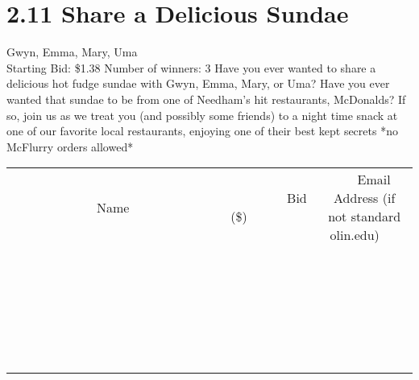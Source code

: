 \documentclass[11pt]{article}
\begin{document}
\section*{2.11 Share a Delicious Sundae}
Gwyn, Emma, Mary, Uma
\\
Starting Bid: \$1.38
\newline
Number of winners: 3
\newline
Have you ever wanted to share a delicious hot fudge sundae with Gwyn, Emma, Mary, or Uma? Have you ever wanted that sundae to be from one of Needham's hit restaurants, McDonalds? If so, join us as we treat you (and possibly some friends) to a night time snack at one of our favorite local restaurants, enjoying one of their best kept secrets *no McFlurry orders allowed*
\\[6ex]
\begin{tabular}{c c c}
~~~~~~~~~~~~~Name~~~~~~~~~~~~~ & ~~~~~~~~~Bid (\$)~~~~~~~~~  & ~~~Email Address (if not standard olin.edu)~~~\\
 & & \\
\hline
 & & \\
\hline
 & & \\
\hline
 & & \\
\hline
 & & \\
\hline
 & & \\
\hline
 & & \\
\hline
 & & \\
\hline
 & & \\
\hline
 & & \\
\hline
 & & \\
\hline
 & & \\
\hline
 & & \\
\hline
 & & \\
\hline
 & & \\
\hline
 & & \\
\hline
 & & \\
\hline
 & & \\
\hline
 & & \\
\hline
 & & \\
\hline
 & & \\
\hline
 & & \\
\hline
 & & \\
\hline
 & & \\
\hline
 & & \\
\hline
 & & \\
\hline
\end{tabular}
\newpage
\end{document}
